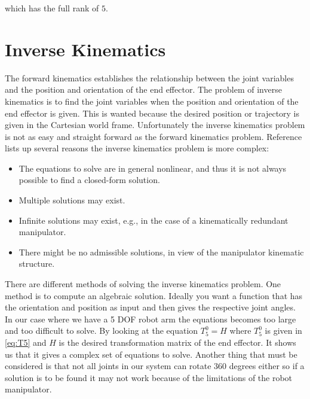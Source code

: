 which has the full rank of $5$. 

















\section{Inverse Kinematics}
The forward kinematics establishes the relationship between the joint variables and the position and orientation of the end effector. The problem of inverse kinematics is to find the joint variables when the position and orientation of the end effector is given. This is wanted because the desired position or trajectory is given in the Cartesian world frame. Unfortunately the inverse kinematics problem is not as easy and straight forward as the forward kinematics problem. Reference \cite{Siciliano} lists up several reasons the inverse kinematics problem is more complex:
\begin{itemize}
    \item The equations to solve are in general nonlinear, and thus it is not always possible to find a closed-form solution.
    \item Multiple solutions may exist.
    \item Infinite solutions may exist, e.g., in the case of a kinematically redundant manipulator.
    \item There might be no admissible solutions, in view of the manipulator kinematic structure.
\end{itemize}
There are different methods of solving the inverse kinematics problem. One method is to compute an algebraic solution. Ideally you want a function that has the orientation and position as input and then gives the respective joint angles. In our case where we have a 5 DOF robot arm the equations becomes too large and too difficult to solve\cite{spong}. By looking at the equation $T_5^0=H$ where $T_5^0$ is given in \eqref{eq:T5} and $H$ is the desired transformation matrix of the end effector. It shows us that it gives a complex set of equations to solve. Another thing that must be considered is that not all joints in our system can rotate 360 degrees either so if a solution is to be found it may not work because of the limitations of the robot manipulator. \\\\
